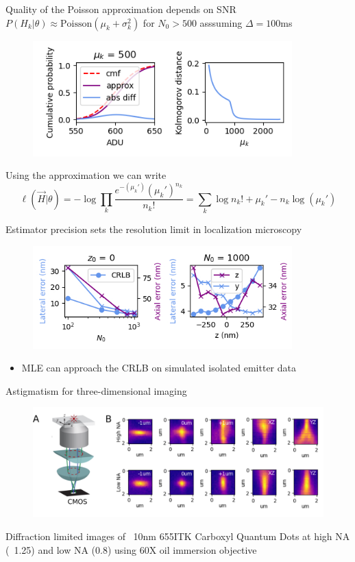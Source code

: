 \documentclass{beamer}					%
\begin{document}
\begin{frame}{Quality of the Poisson approximation depends on SNR}
$P(H_{k}|\theta)\approx \mathrm{Poisson}(\mu_{k}+\sigma_{k}^{2})$ for $N_{0} > 500$ asssuming $\Delta=100$ms 
\begin{figure}
\includegraphics[width=10cm]{Kolmogorov.png}
\end{figure}
Using the approximation we can write
\begin{equation*}
\ell(\vec{H}|\theta) = -\log \prod_{k} \frac{e^{-\left(\mu_{k}'\right)}\left(\mu_{k}'\right)^{n_{k}}}{n_{k}!} = \sum_{k}  \log n_{k}! + \mu_{k}' - n_{k}\log\left(\mu_{k}'\right)
\end{equation*}

\end{frame}

\begin{frame}{Estimator precision sets the resolution limit in localization microscopy}
\begin{figure}
\includegraphics[width=10cm]{Errors.png}
\end{figure}
\begin{itemize}
\item MLE can approach the CRLB on simulated isolated emitter data
\end{itemize}
\end{frame}

\begin{frame}{Astigmatism for three-dimensional imaging}
\begin{figure}
\includegraphics[width=13cm]{Astigmatism.png}
\end{figure}
Diffraction limited images of ~10nm 655ITK Carboxyl Quantum Dots at high NA (~1.25) and low NA (0.8) using 60X oil immersion objective
\end{frame}
\end{document}
